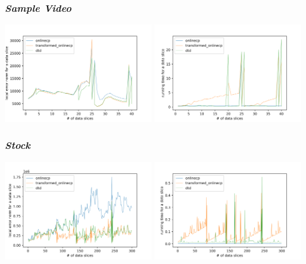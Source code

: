 \subsubsection{\em Sample Video}
\begin{center}
	\includegraphics[width=0.49\textwidth]{FIG/sample_video_error_norm.png}
	\includegraphics[width=0.49\textwidth]{FIG/sample_video_running_time.png}
\end{center}


\subsubsection{\em Stock}
\begin{center}
	\includegraphics[width=0.49\textwidth]{FIG/stock_error_norm.png}
	\includegraphics[width=0.49\textwidth]{FIG/stock_running_time.png}
\end{center}
